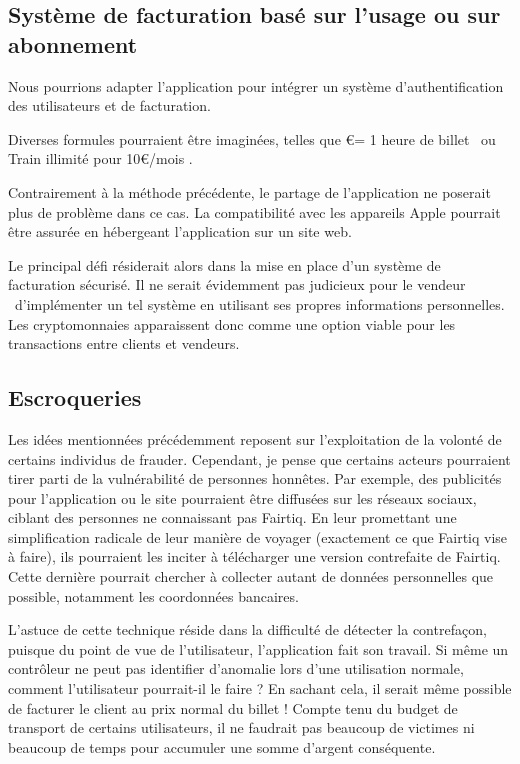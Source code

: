 \documentclass[a4paper]{article}
\begin{document}
\subsection{Système de facturation basé sur l'usage ou sur abonnement}

Nous pourrions adapter l'application pour intégrer un système d'authentification
des utilisateurs et de facturation.

Diverses formules pourraient être imaginées, telles que \euro = 1 heure de billet
\fg\ ou \og Train illimité pour 10\euro/mois \fg.

Contrairement à la méthode précédente, le partage de l'application ne poserait plus
de problème dans ce cas. La compatibilité avec les appareils Apple pourrait être
assurée en hébergeant l'application sur un site web.

Le principal défi résiderait alors dans la mise en place d'un système de facturation sécurisé.
Il ne serait évidemment pas judicieux pour le \og vendeur \fg\ d'implémenter un tel système en utilisant
ses propres informations personnelles. Les cryptomonnaies apparaissent donc comme une option
viable pour les transactions entre clients et vendeurs.


\subsection{Escroqueries}
\label{sub:escroqueries}

Les idées mentionnées précédemment reposent sur l'exploitation de la volonté de certains
individus de frauder. Cependant, je pense que certains acteurs pourraient tirer parti de
la vulnérabilité de personnes honnêtes. Par exemple, des publicités pour l'application
ou le site pourraient être diffusées sur les réseaux sociaux, ciblant des personnes ne connaissant
pas Fairtiq. En leur promettant une simplification radicale de leur manière de voyager (exactement ce que
Fairtiq vise à faire), ils pourraient les inciter à télécharger une version contrefaite de
Fairtiq. Cette dernière pourrait chercher à collecter autant de données personnelles que
possible, notamment les coordonnées bancaires.

L'astuce de cette technique réside dans la difficulté de détecter la contrefaçon, puisque du
point de vue de l'utilisateur, l'application fait son travail.  Si même un contrôleur ne peut pas identifier d'anomalie
lors d'une utilisation normale, comment l'utilisateur pourrait-il le faire ? En sachant cela,
il serait même possible de facturer le client au prix normal du billet ! Compte tenu du budget
de transport de certains utilisateurs, il ne faudrait pas beaucoup de victimes ni beaucoup de temps
pour accumuler une somme d'argent conséquente.
\end{document}
